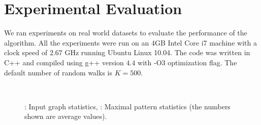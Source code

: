\section{ Experimental Evaluation} 
\label{sec:results}

We ran experiments on real world datasets to
evaluate the performance of the algorithm. All the experiments were run
on an 4GB Intel Core i7 machine with a clock speed of $2.67$ GHz running
Ubuntu Linux 10.04. The code was written in C++ and 
compiled using g++ version $4.4$ with -O3
optimization flag. The default number of random walks is $K=500$.

\begin{comment}
\begin{table}[!h]
  \centering
    \begin{tabular}{|c|c|c|c|c|}
      \hline
      Dataset & $|V|$ & $|E|$ & $|\Sigma|$ & \small{Preprocessing time(sec)} \\
      \hline
      CMDB & $10466$ & $15122$ & $84$ & $329.31$ \\
      SCOP & $39256$ & $154328$ & $20$ & $17.377$ \\
      PPI & $4950$ & $16515$ & $4950$ & $339.45 $\\
	  \hline
    \end{tabular}
    \caption{Dataset Properties}
	\label{tab:db}
\end{table}
\end{comment}


\begin{figure}[!h]
\centering
{} \\
  \caption{ \protect{}: Input graph statistics, 
    \protect{}: Maximal pattern statistics (the numbers
    shown are average values).
  }
  \label{fig:stats}
\end{figure}

